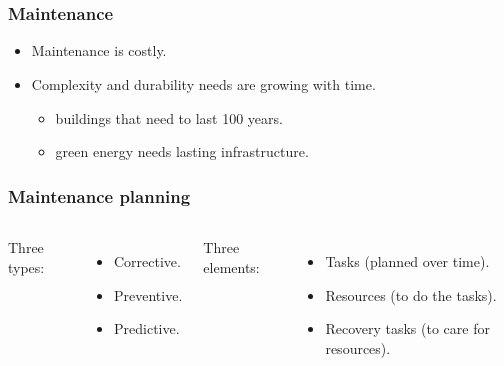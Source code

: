 \section{\introtitle}

\begin{frame}
\frametitle{\textbf{Maintenance}}

  \begin{itemize}[<+->]
  \item
    Maintenance is costly.
  \item
    Complexity and durability needs are growing with time.

    \begin{itemize}[<+->]
    
    \item
      buildings that need to last 100 years.
    \item
      green energy needs lasting infrastructure.
    \end{itemize}
  \end{itemize}

\end{frame}

\begin{frame}
\frametitle{\textbf{Maintenance planning}}

  \begin{columns}[c]
    Three types:
    \pause
    \begin{itemize}[<+->]
      \item Corrective.
      \item \alert<5->{Preventive}.
      \item Predictive.
    \end{itemize} 

  \pause
  Three elements:

  \begin{itemize}[<+->]
    \item Tasks (planned over time).
    \item Resources (to do the tasks).
    \item Recovery tasks (to care for resources).
  \end{itemize}
  \end{columns}

\end{frame}

